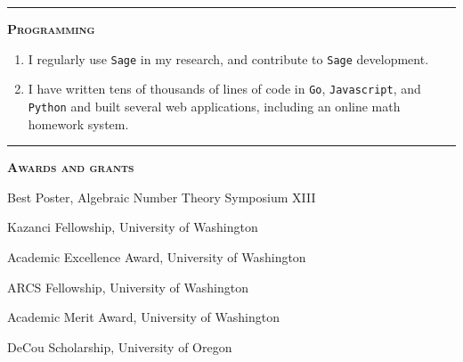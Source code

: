 \documentclass[12pt]{article}
\newcommand{\sectionheading}[1]
{
\bigskip %
\noindent
\hspace{-6.5mm}\textcolor{Gray}{\rule[.75mm]{21.5mm}{1mm}} %
\hspace{.2mm}	%
{\large{\textbf{\textsc{#1}}}} %
}
\newenvironment{date_section}
	{
	\vspace{-1ex}
	\leftmargini = 15ex
		\begin{itemize}[
			labelsep = *,
			labelwidth = 9ex,
			labelindent = 0ex,
			itemindent = !,
			font=\normalfont,
			align=parleft
		]{}
		\itemsep=-1.5mm
	}
	{\end{itemize}\vspace{-2ex}}
\newcommand{\yearmo}[2]{
	\item[
		{\makebox[1ex][r]{#1}}
		\hspace{1ex}
		{\makebox[1ex][l]{#2} }
		] }
\begin{document}
	\sectionheading{Programming}%

	\begin{enumerate}[label=$\bullet$, itemsep=-1mm, leftmargin=24mm]
		\item I regularly use {\tt Sage} in my research, and contribute to {\tt Sage} development.
		\item I have written tens of thousands of lines of code in {\tt Go}, {\tt Javascript}, and {\tt Python} and built several web applications, including an online math homework system.
	\end{enumerate}




	\sectionheading{Awards and grants}%

	\begin{date_section}
		\yearmo{}{2018} %
		Best Poster, Algebraic Number Theory Symposium XIII
		\yearmo{}{2017}%
		Kazanci Fellowship, University of Washington
		\yearmo{}{2014}%
		Academic Excellence Award, University of Washington
		\yearmo{}{2013}%
		ARCS Fellowship, University of Washington
		\yearmo{}{2013}%
		Academic Merit Award, University of Washington
		\yearmo{}{2012}%
		DeCou Scholarship, University of Oregon
	\end{date_section}
\end{document}
